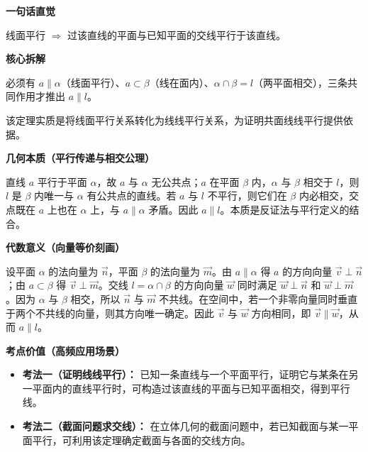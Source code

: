 \begin{explanationbox}
	\textbf{\textcolor{CExplanation}{一句话直觉}}

	线面平行 $\Rightarrow$ 过该直线的平面与已知平面的交线平行于该直线。

	\medskip
	\textbf{\textcolor{CExplanation}{核心拆解}}
	\begin{description}[style=nextline, leftmargin=2.8em, labelsep=0.5em, itemsep=0.45em]
		\item[\textbf{要点一（三条件缺一不可）：}] 必须有 $a\parallel\alpha$（线面平行）、$a\subset\beta$（线在面内）、$\alpha\cap\beta=l$（两平面相交），三条共同作用才推出 $a\parallel l$。
		\item[\textbf{要点二（平行关系传递）：}] 该定理实质是将线面平行关系转化为线线平行关系，为证明共面线线平行提供依据。
	\end{description}

	\medskip
	\textbf{\textcolor{CExplanation}{几何本质（平行传递与相交公理）}}

	直线 $a$ 平行于平面 $\alpha$，故 $a$ 与 $\alpha$ 无公共点；$a$ 在平面 $\beta$ 内，$\alpha$ 与 $\beta$ 相交于 $l$，则 $l$ 是 $\beta$ 内唯一与 $\alpha$ 有公共点的直线。若 $a$ 与 $l$ 不平行，则它们在 $\beta$ 内必相交，交点既在 $a$ 上也在 $\alpha$ 上，与 $a\parallel\alpha$ 矛盾。因此 $a\parallel l$。本质是反证法与平行定义的结合。

	\medskip
	\textbf{\textcolor{CExplanation}{代数意义（向量等价刻画）}}

	设平面 $\alpha$ 的法向量为 $\vec{n}$，平面 $\beta$ 的法向量为 $\vec{m}$。由 $a\parallel\alpha$ 得 $a$ 的方向向量 $\vec{v}\perp\vec{n}$；由 $a\subset\beta$ 得 $\vec{v}\perp\vec{m}$。交线 $l=\alpha\cap\beta$ 的方向向量 $\vec{w}$ 同时满足 $\vec{w}\perp\vec{n}$ 和 $\vec{w}\perp\vec{m}$。因为 $\alpha$ 与 $\beta$ 相交，所以 $\vec{n}$ 与 $\vec{m}$ 不共线。在空间中，若一个非零向量同时垂直于两个不共线的向量，则其方向唯一确定。因此 $\vec{v}$ 与 $\vec{w}$ 方向相同，即 $\vec{v}\parallel\vec{w}$，从而 $a\parallel l$。

	\medskip
	\textbf{\textcolor{CExplanation}{考点价值（高频应用场景）}}
	\begin{itemize}[leftmargin=*, itemsep=0.5em, topsep=0.4em]
		\item \textbf{考法一（证明线线平行）：} 已知一条直线与一个平面平行，证明它与某条在另一平面内的直线平行时，可构造过该直线的平面与已知平面相交，得到平行线。
		\item \textbf{考法二（截面问题求交线）：} 在立体几何的截面问题中，若已知截面与某一平面平行，可利用该定理确定截面与各面的交线方向。
	\end{itemize}


\end{explanationbox}
